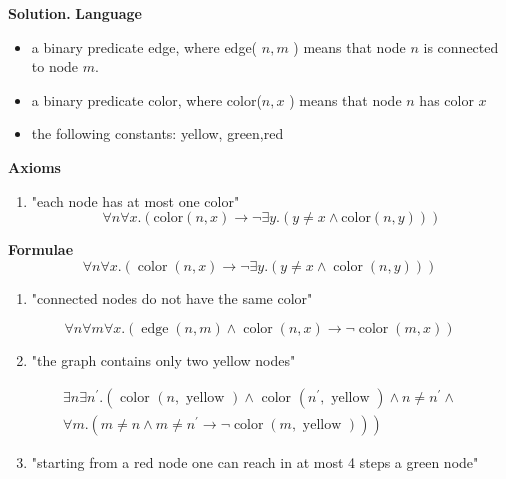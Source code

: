 \begin{sol}
\textbf{Solution.}
\textbf{Language}
\begin{itemize}
  \item a binary predicate edge, where edge( $n, m$ ) means that node $n$ is connected to node $m$.
  \item a binary predicate color, where color($n, x$ ) means that node $n$ has color $x$
  \item the following constants: yellow, green,red
\end{itemize}

\textbf{Axioms}
\begin{enumerate}
  \item
    "each node has at most one color"
    $$\forall n \forall x . (\text{color}(n, x) \rightarrow \neg \exists y. (y \ne x \land \text{color}(n, y)))$$
\end{enumerate}

\textbf{Formulae}
$$
\forall n \forall x .(\operatorname{color}(n, x) \rightarrow \neg \exists y .(y \neq x \wedge \operatorname{color}(n, y)))
$$

\begin{enumerate}
  \item "connected nodes do not have the same color"
\end{enumerate}

$$
\forall n \forall m \forall x .(\operatorname{edge}(n, m) \wedge \operatorname{color}(n, x) \rightarrow \neg \operatorname{color}(m, x))
$$

\begin{enumerate}
  \setcounter{enumi}{1}
  \item "the graph contains only two yellow nodes"
\end{enumerate}

$$
\begin{array}{r}
\exists n \exists n^{\prime} .\left(\text { color }(n, \text { yellow }) \wedge \text { color }\left(n^{\prime}, \text { yellow }\right) \wedge n \neq n^{\prime} \wedge\right. \\
\left.\forall m .\left(m \neq n \wedge m \neq n^{\prime} \rightarrow \neg \operatorname{color}(m, \text { yellow })\right)\right)
\end{array}
$$

\begin{enumerate}
  \setcounter{enumi}{2}
  \item "starting from a red node one can reach in at most 4 steps a green node"
\end{enumerate}


\end{sol}
